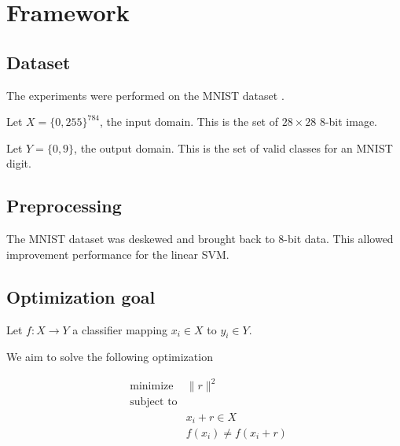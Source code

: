 \documentclass{article} %
\begin{document}

\section{Framework}


\subsection{Dataset}

The experiments were performed on the MNIST dataset \citep{lecun_mnist_1998}.

Let \begin{math} X=\{0, 255\}^{784} \end{math}, the input domain.
This is the set of $28\times28$ 8-bit image.

Let \begin{math} Y = \{0, 9\} \end{math}, the output domain.
This is the set of valid classes for an MNIST digit.


\subsection{Preprocessing}

The MNIST dataset was deskewed and brought back to 8-bit data. This allowed
improvement performance for the linear SVM.


\subsection{Optimization goal}

Let \begin{math} f:X \rightarrow  Y \end{math} a classifier mapping $x_i \in
X$ to $y_i \in Y$.

We aim to solve the following optimization

\begin{equation}
\label{eq:optimization}
\begin{aligned}
& {\text{minimize}}
&   \lVert{r} \rVert^2\\
& \text{subject to} \\
& & x_i + r \in X \\
& & f(x_i) \neq f(x_i + r)
\end{aligned}
\end{equation}
\end{document}
